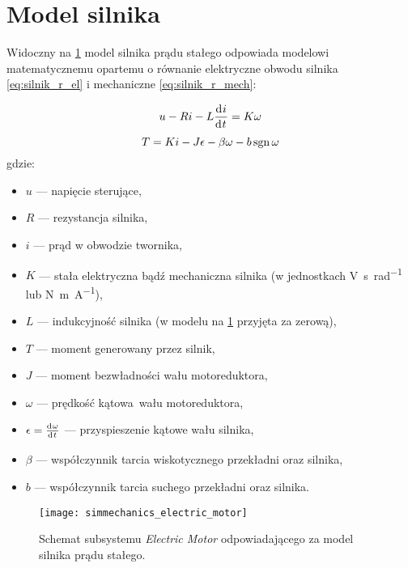 \section{Model silnika}
\label{sec:ch4_model_silnika}

Widoczny na \cref{fig:sm_electric_motor} model silnika prądu stałego odpowiada modelowi matematycznemu opartemu o równanie elektryczne obwodu silnika \eqref{eq:silnik_r_el} i mechaniczne \eqref{eq:silnik_r_mech}:

\begin{equation}\label{eq:silnik_r_el}
    u - R i - L \deriv{i}{t} = K \omega 
\end{equation}
\begin{equation}\label{eq:silnik_r_mech}
    T = K i - J \epsilon - \beta \omega - b \operatorname{sgn} \omega
\end{equation}
gdzie:
\begin{itemize}
    \item $u$ --- napięcie sterujące,
    \item $R$ --- rezystancja silnika,
    \item $i$ --- prąd w obwodzie twornika,
    \item $K$ --- stała elektryczna bądź mechaniczna silnika (w jednostkach \si{\volt\second\per\radian} lub \si{\newton\meter\per\ampere}),
    \item $L$ --- indukcyjność silnika (w modelu na \cref{fig:sm_electric_motor} przyjęta za zerową),
    \item $T$ --- moment generowany przez silnik,
    \item $J$ --- moment bezwładności wału motoreduktora,
    \item $\omega$ --- prędkość kątowa wału motoreduktora,
    \item $\epsilon = \deriv{\omega}{t}$ --- przyspieszenie kątowe wału silnika,
    \item $\beta$ --- współczynnik tarcia wiskotycznego przekładni oraz silnika,
    \item $b$ --- współczynnik tarcia suchego przekładni oraz silnika.
\end{itemize}

\begin{figure}[h]
    \centering
    \texttt{[image: simmechanics\_electric\_motor]}
    \caption{Schemat subsystemu \textit{Electric Motor} odpowiadającego za model silnika prądu stałego.}
    \label{fig:sm_electric_motor}
\end{figure}

